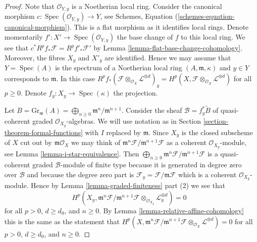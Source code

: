 \documentclass{stacks-project}
\theoremstyle{plain}
\theoremstyle{definition}
\theoremstyle{remark}
\numberwithin{equation}{subsection}
\def\Spec{\mathop{\mathrm{Spec}}}
\begin{document}
\begin{proof}
Note that $\mathcal{O}_{Y, y}$ is a Noetherian local ring.
Consider the canonical morphism
$c : \Spec(\mathcal{O}_{Y, y}) \to Y$, see
Schemes, Equation (\ref{schemes-equation-canonical-morphism}).
This is a flat morphism as it identifies local rings.
Denote momentarily $f' : X' \to \Spec(\mathcal{O}_{Y, y})$
the base change of $f$ to this local ring. We see that
$c^*R^pf_*\mathcal{F} = R^pf'_*\mathcal{F}'$ by
Lemma \ref{lemma-flat-base-change-cohomology}.
Moreover, the fibres $X_y$ and $X'_y$ are identified.
Hence we may assume that $Y = \Spec(A)$ is the spectrum of
a Noetherian local ring $(A, \mathfrak m, \kappa)$ and $y \in Y$
corresponds to $\mathfrak m$. In this case
$R^pf_*(\mathcal{F} \otimes_{\mathcal{O}_X} \mathcal{L}^{\otimes d})_y =
H^p(X, \mathcal{F} \otimes_{\mathcal{O}_X} \mathcal{L}^{\otimes d})$
for all $p \geq 0$. Denote $f_y : X_y \to \Spec(\kappa)$ the projection.

\medskip\noindent
Let $B = \text{Gr}_\mathfrak m(A) =
\bigoplus_{n \geq 0} \mathfrak m^n/\mathfrak m^{n + 1}$.
Consider the sheaf $\mathcal{B} = f_y^*\widetilde{B}$
of quasi-coherent graded $\mathcal{O}_{X_y}$-algebras.
We will use notation as in Section \ref{section-theorem-formal-functions}
with $I$ replaced by $\mathfrak m$.
Since $X_y$ is the closed subscheme of $X$ cut out by
$\mathfrak m\mathcal{O}_X$ we may think of
$\mathfrak m^n\mathcal{F}/\mathfrak m^{n + 1}\mathcal{F}$
as a coherent $\mathcal{O}_{X_y}$-module, see
Lemma \ref{lemma-i-star-equivalence}. Then
$\bigoplus_{n \geq 0} \mathfrak m^n\mathcal{F}/\mathfrak m^{n + 1}\mathcal{F}$
is a quasi-coherent graded $\mathcal{B}$-module of finite type
because it is generated in degree zero over $\mathcal{B}$
and because the degree zero part is
$\mathcal{F}_y = \mathcal{F}/\mathfrak m \mathcal{F}$
which is a coherent $\mathcal{O}_{X_y}$-module.
Hence by Lemma \ref{lemma-graded-finiteness} part (2)
we see that
$$
H^p(X_y, \mathfrak m^n \mathcal{F}/ \mathfrak m^{n + 1}\mathcal{F}
\otimes_{\mathcal{O}_{X_y}} \mathcal{L}_y^{\otimes d}) = 0
$$
for all $p > 0$, $d \geq d_0$, and $n \geq 0$. By
Lemma \ref{lemma-relative-affine-cohomology}
this is the same as the statement that
$
H^p(X, \mathfrak m^n \mathcal{F}/ \mathfrak m^{n + 1}\mathcal{F}
\otimes_{\mathcal{O}_X} \mathcal{L}^{\otimes d}) = 0
$
for all $p > 0$, $d \geq d_0$, and $n \geq 0$.


\end{proof}
\end{document}
